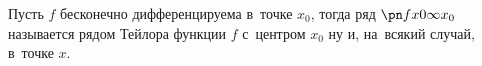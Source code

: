 
    Пусть $f$ бесконечно дифференцируема в~точке $x_0$, тогда ряд $\pn fx0{\infty}{x_0}$ называется рядом Тейлора функции $f$  с~центром $x_0$ ну и, на~всякий
    случай, в~точке $x$.
